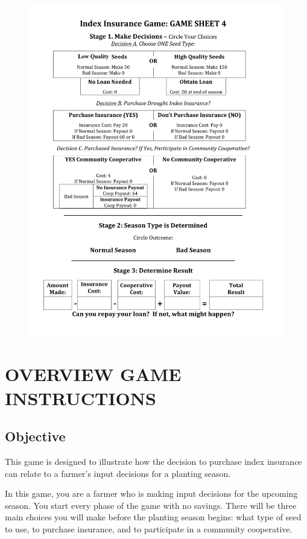 \documentclass[letterpaper,10pt,english]{sphinxmanual}
\begin{document}
\begin{figure}[htbp]
\centering

\includegraphics{indexinsurancegame4_en1.png}
\end{figure}


\chapter{OVERVIEW GAME INSTRUCTIONS}
\label{games/gameinstructions_quickreference_en:overview-game-instructions}\label{games/gameinstructions_quickreference_en::doc}

\section{Objective}
\label{games/gameinstructions_quickreference_en:objective}
This game is designed to illustrate how the decision to purchase index insurance can relate to a farmer’s input decisions for a planting season.

In this game, you are a farmer who is making input decisions for the upcoming season.  You start every phase of the game with no savings. There will be three main choices you will make before the planting season begins: what type of seed to use, to purchase insurance, and to participate in a community cooperative.
\end{document}
